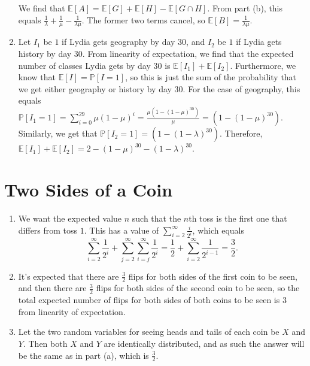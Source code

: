 \documentclass{article}
\newcommand{\p}{\mathbb{P}}
\begin{document}
\begin{enumerate}[label=(\alph*)]
	We find that $\mathbb{E}[A] = \mathbb{E}[G] + \mathbb{E}[H] - \mathbb{E}[G \cap H]$. From part (b), this equals $\frac{1}{\lambda} + \frac{1}{\mu} - \frac{1}{\lambda \mu}$. The former two terms cancel, so $\mathbb{E}[B] = \boxed{\frac{1}{\lambda \mu}}$.
	\item Let $I_1$ be $1$ if Lydia gets geography by day 30, and $I_2$ be $1$ if Lydia gets history by day 30. From linearity of expectation, we find that the expected number of classes Lydia gets by day 30 is $\mathbb{E}[I_1] + \mathbb{E}[I_2]$. Furthermore, we know that $\mathbb{E}[I] = \p[I = 1]$, so this is just the sum of the probability that we get either geography or history by day 30. For the case of geography, this equals $\p[I_1 = 1] = \sum_{i=0}^{29} \mu(1-\mu)^i = \frac{\mu(1-(1-\mu)^{30})}{\mu} = (1-(1-\mu)^{30})$. Similarly, we get that $\p[I_2 = 1] = (1-(1-\lambda)^{30})$. Therefore, $\mathbb{E}[I_1] + \mathbb{E}[I_2] = \boxed{2-(1-\mu)^{30}-(1-\lambda)^{30}}$.
\end{enumerate}

\newpage
\section{Two Sides of a Coin}
\begin{enumerate}[label=(\alph*)]
	\item We want the expected value $n$ such that the $n$th toss is the first one that differs from toss $1$. This has a value of $\sum_{i=2}^\infty \frac{i}{2^i}$, which equals \[\sum_{i=2}^\infty \frac{1}{2^i} + \sum_{j=2}^\infty \sum_{i=j}^\infty \frac{1}{2^i} = \frac{1}{2} + \sum_{i=2}^\infty \frac{1}{2^{i-1}} = \boxed{\frac{3}{2}}.\]
	\item It's expected that there are $\frac{3}{2}$ flips for both sides of the first coin to be seen, and then there are $\frac{3}{2}$ flips for both sides of the second coin to be seen, so the total expected number of flips for both sides of both coins to be seen is $\boxed{3}$ from linearity of expectation.
	\item Let the two random variables for seeing heads and tails of each coin be $X$ and $Y$. Then both $X$ and $Y$ are identically distributed, and as such the answer will be the same as in part (a), which is $\boxed{\frac{3}{2}}$.
\end{enumerate}
\end{document}
